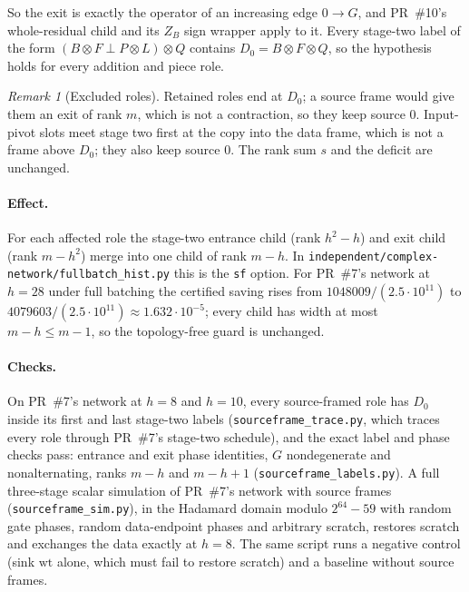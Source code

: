 \documentclass[11pt]{article}
\theoremstyle{remark}\newtheorem*{remark}{Remark}
\begin{document}
So the exit is exactly the operator of an increasing edge $0\to G$, and PR~\#10's whole-residual child and its
$Z_B$ sign wrapper apply to it. Every stage-two label of the form $(B\otimes F\perp P\otimes L)\otimes Q$ contains
$D_0=B\otimes F\otimes Q$, so the hypothesis holds for every addition and piece role.

\begin{remark}[Excluded roles]
Retained roles end at $D_0$; a source frame would give them an exit of rank $m$, which is not a contraction, so
they keep source $0$. Input-pivot slots meet stage two first at the copy into the data frame, which is not a
frame above $D_0$; they also keep source $0$. The rank sum $s$ and the deficit are unchanged.
\end{remark}

\paragraph{Effect.} For each affected role the stage-two entrance child (rank $h^2-h$) and exit child (rank $m-h^2$)
merge into one child of rank $m-h$. In \texttt{independent/complex-network/fullbatch\_hist.py} this is the
\texttt{sf} option. For PR~\#7's network at $h=28$ under full batching the certified saving rises from
$1048009/(2.5\cdot10^{11})$ to $4079603/(2.5\cdot10^{11})\approx1.632\cdot10^{-5}$; every child has width at most
$m-h\le m-1$, so the topology-free guard is unchanged.

\paragraph{Checks.} On PR~\#7's network at $h=8$ and $h=10$, every source-framed role has $D_0$ inside its first
and last stage-two labels (\texttt{sourceframe\_trace.py}, which traces every role through PR~\#7's stage-two schedule), and the exact label and phase checks pass: entrance and exit phase identities, $G$
nondegenerate and nonalternating, ranks $m-h$ and $m-h+1$ (\texttt{sourceframe\_labels.py}). A full three-stage
scalar simulation of PR~\#7's network with source frames (\texttt{sourceframe\_sim.py}), in the Hadamard domain
modulo $2^{64}-59$ with random gate phases, random data-endpoint phases and arbitrary scratch, restores scratch
and exchanges the data exactly at $h=8$. The same script runs a negative control (sink $\mathrm{wt}$ alone, which
must fail to restore scratch) and a baseline without source frames.
\end{document}
